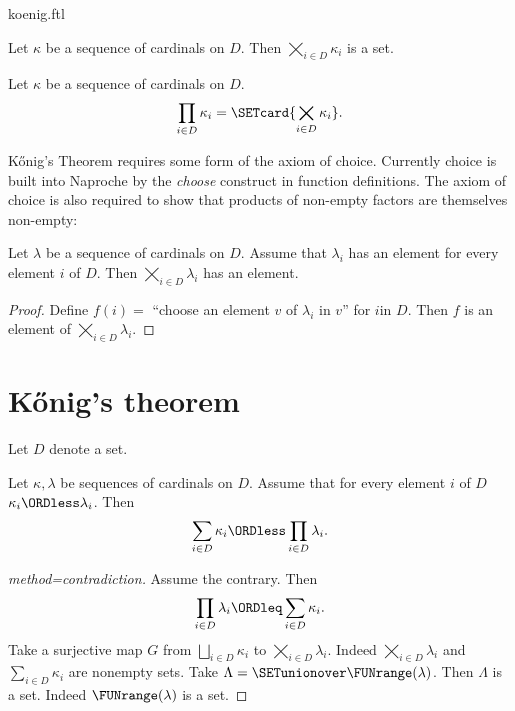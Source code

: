 \documentclass{stex}
\newcommand{\SumSet}[2]{\bigsqcup_{i \in #2} #1_{i}}
\newcommand{\Sum}[2]{\sum_{i \in #2} #1_{i}}
\newcommand{\ProdSet}[2]{\bigtimes_{i \in #2} #1_{i}}
\newcommand{\Prod}[2]{\prod_{i \in #2} #1_{i}}
\begin{document}
\begin{smodule}{koenig.ftl}
\begin{forthel}
  \begin{axiom*}
    Let $\kappa$ be a sequence of cardinals on $D$.
    Then $\ProdSet{\kappa}{D}$ is a set.
  \end{axiom*}

  \begin{definition*}
    Let $\kappa$ be a sequence of cardinals on $D$.
    \[ \Prod{\kappa}{D} = \SETcard{ \ProdSet{\kappa}{D} }. \]
  \end{definition*}
\end{forthel}

Kőnig's Theorem requires some form of the axiom of choice.
Currently choice is built into Naproche by the \emph{choose} construct in
function definitions.
The axiom of choice is also required to show that products of non-empty factors
are themselves non-empty:

\begin{forthel}
  \begin{lemma*}[title=Choice]
    Let $\lambda$ be a sequence of cardinals on $D$.
    Assume that $\lambda_{i}$ has an element for every element $i$ of $D$.
    Then $\ProdSet{\lambda}{D}$ has an element.
  \end{lemma*}
  \begin{proof}
    Define $f(i) =$ ``choose an element $v$ of $\lambda_{i}$ in $v$'' for $i$in $D$.
    Then $f$ is an element of $\ProdSet{\lambda}{D}$.
  \end{proof}
\end{forthel}


\section*{Kőnig's theorem}

\begin{forthel}
  Let $D$ denote a set.

  \begin{theorem*}[title=Kőnig,id=koenig]
    Let $\kappa, \lambda$ be sequences of cardinals on $D$.
    Assume that for every element $i$ of $D$ $\kappa_{i} \ORDless \lambda_{i}$.
    Then \[ \Sum{\kappa}{D} \ORDless \Prod{\lambda}{D}. \]
  \end{theorem*}
  \begin{proof}[method=contradiction]
    Assume the contrary.
    Then \[ \Prod{\lambda}{D} \ORDleq \Sum{\kappa}{D}. \]
    Take a surjective map $G$ from $\SumSet{\kappa}{D}$ to $\ProdSet{\lambda}{D}$.
    Indeed $\ProdSet{\lambda}{D}$ and $\Sum{\kappa}{D}$ are nonempty sets.
    Take $\Lambda = \SETunionover \FUNrange(\lambda)$.
    Then $\Lambda$ is a set.
    Indeed $\FUNrange(\lambda)$ is a set.


\end{proof}
\end{forthel}
\end{smodule}
\end{document}
